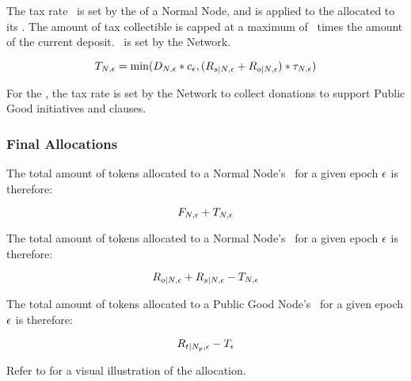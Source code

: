 The tax rate \taxRate\ is set by the  of a Normal Node, and is applied to the  allocated to its \stakingPool.
The amount of tax collectible is capped at a maximum of \taxCap\ times the amount of the current deposit. \taxCap\ is set by the Network.

\begin{equation}
    T_{N, \epsilon} =
    \min(D_{N, \epsilon}
    * c_{\epsilon} , (R_{s|N, \epsilon}
    + R_{o|N, \epsilon} ) 
    * \tau_{N, \epsilon})
\end{equation}

For the , the tax rate is set by the Network to collect donations to support Public Good initiatives and clauses.

\subsubsection{Final Allocations}
\label{subsubsec:allocation}

The total amount of tokens allocated to a Normal Node's \operationPool\ for a given epoch $\epsilon$ is therefore:

\begin{equation}
    F_{N, \epsilon}
    + T_{N, \epsilon}
\end{equation}

The total amount of tokens allocated to a Normal Node's \stakingPool\ for a given epoch $\epsilon$ is therefore:

\begin{equation}
    R_{o|N, \epsilon}
    + R_{s|N, \epsilon}
    - T_{N, \epsilon}
\end{equation}

The total amount of tokens allocated to a Public Good Node's \publicGoodPool\ for a given epoch $\epsilon$ is therefore:

\begin{equation}
    R_{t|N_p, \epsilon}
    - T_{\epsilon}
\end{equation}


Refer to  for a visual illustration of the  allocation.